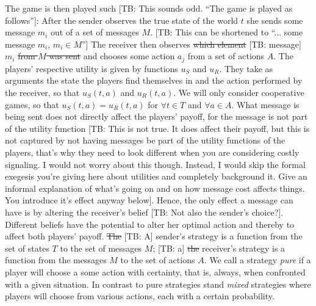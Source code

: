\documentclass[10pt]{article}
\newcommand{\tb}[1]{\textcolor[rgb]{.8,.33,.0}{[TB: #1]}}%
\begin{document}
The game is then played such \tb{This sounds odd. ``The game is played as follows''}: After the sender observes the true state of the world $t$ she sends some message $m_i$ out of a set of messages $M$. \tb{This can be shortened to ``... some message $m_i$, $m_i \in M$''}
The receiver then observes \sout{which element} \tb{message} $m_i$ \sout{from $M$ was sent} and chooses some action $a_j$ from a set of actions $A$.
The players' respective utility is given by functions $u_S$ and $u_R$. They take as arguments the state the players find themselves in and the action performed by the receiver, so that $u_S(t,a)$ and $u_R(t,a)$. We will only consider cooperative games, so that $u_S(t,a)=u_R(t,a)$ for $\forall t\in T$ and $\forall a\in A$.
What message is being sent does not directly affect the players' payoff, for the message is not part of the utility function \tb{This is not true. It does affect their payoff, but this is not captured by not having messages be part of the utility functions of the players, that's why they need to look different when you are considering costly signaling. I would not worry about this though. Instead, I would skip the formal exegesis you're giving here about utilities and completely background it. Give an informal explanation of what's going on and on how message cost affects things. You introduce it's effect anyway below}. Hence, the only effect a message can have is by altering the receiver's belief \tb{Not also the sender's choice?}. Different beliefs have the potential to alter her optimal action and thereby to affect both players' payoff.
\sout{The} \tb{A} sender's strategy is a function from the set of states $T$ to the set of messages $M$; \tb{a} \sout{the} receiver's strategy is a function from the messages $M$ to the set of actions $A$.
We call a strategy \textit{pure} if a player will choose a some action with certainty, that is, always, when confronted with a given situation. In contrast to pure strategies stand
\textit{mixed} strategies where players will choose from various actions, each with a certain probability.
\end{document}
